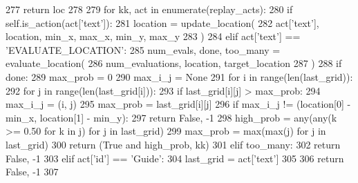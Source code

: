 \begin{DoxyCode}
277             \textcolor{keywordflow}{return} loc
278 
279         \textcolor{keywordflow}{for} kk, act \textcolor{keywordflow}{in} enumerate(replay\_acts):
280             \textcolor{keywordflow}{if} self.is\_action(act[\textcolor{stringliteral}{'text'}]):
281                 location = update\_location(
282                     act[\textcolor{stringliteral}{'text'}], location, min\_x, max\_x, min\_y, max\_y
283                 )
284             \textcolor{keywordflow}{elif} act[\textcolor{stringliteral}{'text'}] == \textcolor{stringliteral}{'EVALUATE\_LOCATION'}:
285                 num\_evals, done, too\_many = evaluate\_location(
286                     num\_evaluations, location, target\_location
287                 )
288                 \textcolor{keywordflow}{if} done:
289                     max\_prob = 0
290                     max\_i\_j = \textcolor{keywordtype}{None}
291                     \textcolor{keywordflow}{for} i \textcolor{keywordflow}{in} range(len(last\_grid)):
292                         \textcolor{keywordflow}{for} j \textcolor{keywordflow}{in} range(len(last\_grid[i])):
293                             \textcolor{keywordflow}{if} last\_grid[i][j] > max\_prob:
294                                 max\_i\_j = (i, j)
295                                 max\_prob = last\_grid[i][j]
296                     \textcolor{keywordflow}{if} max\_i\_j != (location[0] - min\_x, location[1] - min\_y):
297                         \textcolor{keywordflow}{return} \textcolor{keyword}{False}, -1
298                     high\_prob = any(any(k >= 0.50 \textcolor{keywordflow}{for} k \textcolor{keywordflow}{in} j) \textcolor{keywordflow}{for} j \textcolor{keywordflow}{in} last\_grid)
299                     max\_prob = max(max(j) \textcolor{keywordflow}{for} j \textcolor{keywordflow}{in} last\_grid)
300                     \textcolor{keywordflow}{return} (\textcolor{keyword}{True} \textcolor{keywordflow}{and} high\_prob, kk)
301                 \textcolor{keywordflow}{elif} too\_many:
302                     \textcolor{keywordflow}{return} \textcolor{keyword}{False}, -1
303             \textcolor{keywordflow}{elif} act[\textcolor{stringliteral}{'id'}] == \textcolor{stringliteral}{'Guide'}:
304                 last\_grid = act[\textcolor{stringliteral}{'text'}]
305 
306         \textcolor{keywordflow}{return} \textcolor{keyword}{False}, -1
307 
\end{DoxyCode}
\mbox{\label{classparlai_1_1mturk_1_1tasks_1_1talkthewalk_1_1worlds_1_1TalkTheWalkWorld_a97f6a127548df0b16c669ea71b981c16}} 
